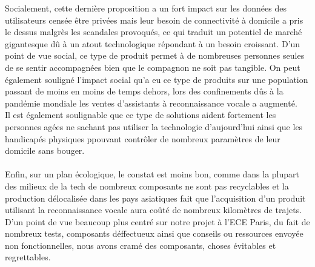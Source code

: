 \documentclass[a4paper,11pt]{book}
\begin{document}
Socialement, cette dernière proposition a un fort impact sur les données des utilisateurs censée être privées mais leur besoin de connectivité à domicile a pris le dessus malgrès les scandales provoqués, ce qui traduit un potentiel de marché gigantesque dû à un atout technologique répondant à un besoin croissant. D'un point de vue social, ce type de produit permet à de nombreuses personnes seules de se sentir accompagnées bien que le compagnon ne soit pas tangible. On peut également souligné l'impact social qu'a eu ce type de produits sur une population passant de moins en moins de temps dehors, lors des confinements dûs à la pandémie mondiale les ventes d'assistants à reconnaissance vocale a augmenté. \\ 
Il est également soulignable que ce type de solutions aident fortement les personnes agées ne sachant pas utiliser la technologie d'aujourd'hui ainsi que les handicapés physiques ppouvant contrôler de nombreux paramètres de leur domicile sans bouger.\\ \\

Enfin, sur un plan écologique, le constat est moins bon, comme dans la plupart des milieux de la tech de nombreux composants ne sont pas recyclables et la production délocalisée dans les pays asiatiques fait que l'acquisition d'un produit utilisant la reconnaissance vocale aura coûté de nombreux kilomètres de trajets. D'un point de vue beaucoup plus centré sur notre projet à l'ECE Paris, du fait de nombreux tests, composants déffectueux ainsi que conseils ou ressources envoyée non fonctionnelles, nous avons cramé des composants, choses évitables et regrettables.\\ \\ \\ \\ \\
\end{document}
